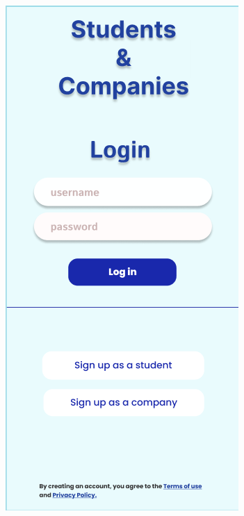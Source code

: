 \begin{figure}[ht]
    \centering
    \begin{minipage}{0.45\textwidth}
        \centering
        \includegraphics[width=\textwidth]{RASD-Latex/assets/UI images/login_phone.png}

\end{minipage}
\end{figure}
